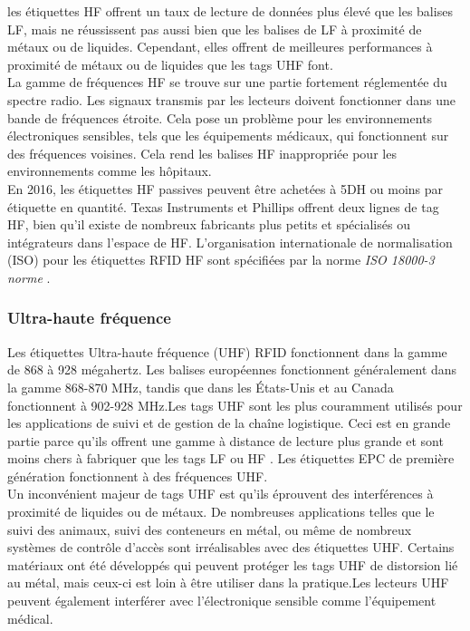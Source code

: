 \documentclass[11pt, a4paper, twoside]{book}
\begin{document}
les étiquettes HF offrent un taux de lecture de données plus élevé que les balises LF, mais ne réussissent pas aussi bien que les balises de LF à proximité de métaux ou de liquides. Cependant, elles offrent de meilleures performances à proximité de métaux ou de liquides que les tags UHF font.\\

La gamme de fréquences HF se trouve sur une partie fortement réglementée du spectre radio. Les signaux transmis par les lecteurs doivent fonctionner dans une bande de fréquences étroite. Cela pose un problème pour les environnements électroniques sensibles, tels que les équipements médicaux, qui fonctionnent sur des fréquences voisines. Cela rend les balises HF inappropriée pour les environnements comme les hôpitaux.\\

En 2016, les étiquettes HF passives peuvent être achetées à 5DH ou moins par étiquette en quantité. Texas Instruments et Phillips offrent deux lignes de tag HF, bien qu'il existe de nombreux fabricants plus petits et spécialisés ou intégrateurs dans l'espace de HF.
L'organisation internationale de normalisation (ISO) pour les étiquettes RFID HF sont spécifiées par la norme \emph{ISO 18000-3 norme} \cite{iso}.\\
\subsubsection{Ultra-haute fréquence}
Les étiquettes Ultra-haute fréquence (UHF) RFID fonctionnent dans la gamme de 868 à 928 mégahertz. Les balises européennes fonctionnent généralement dans la gamme 868-870 MHz, tandis que dans les États-Unis et au Canada fonctionnent à 902-928 MHz.Les tags UHF sont les plus couramment utilisés pour les applications de suivi et de gestion de la chaîne logistique. Ceci est en grande partie parce qu'ils offrent une gamme à distance de lecture plus grande et sont moins chers à fabriquer  que les tags LF ou HF . Les étiquettes EPC de première génération fonctionnent à des fréquences UHF.\\

Un inconvénient majeur de tags UHF est qu'ils éprouvent des interférences à proximité de liquides ou de métaux. De nombreuses applications telles que le suivi des animaux, suivi des conteneurs en métal, ou même de nombreux systèmes de contrôle d'accès sont irréalisables avec des étiquettes UHF. Certains matériaux ont été développés qui peuvent protéger les tags UHF de distorsion lié au métal, mais ceux-ci est loin à être utiliser dans la pratique.Les lecteurs UHF peuvent également interférer avec l'électronique sensible comme l'équipement médical.\\
\end{document}
